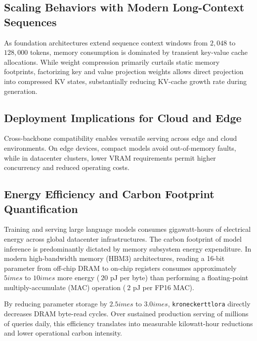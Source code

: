 \subsection{Scaling Behaviors with Modern Long-Context Sequences}
As foundation architectures extend sequence context windows from $2{,}048$ to $128{,}000$ tokens, memory consumption is dominated by transient key-value cache allocations. While weight compression primarily curtails static memory footprints, factorizing key and value projection weights allows direct projection into compressed KV states, substantially reducing KV-cache growth rate during generation.

\subsection{Deployment Implications for Cloud and Edge}
Cross-backbone compatibility enables versatile serving across edge and cloud environments. On edge devices, compact models avoid out-of-memory faults, while in datacenter clusters, lower VRAM requirements permit higher concurrency and reduced operating costs.

\subsection{Energy Efficiency and Carbon Footprint Quantification}
Training and serving large language models consumes gigawatt-hours of electrical energy across global datacenter infrastructures. The carbon footprint of model inference is predominantly dictated by memory subsystem energy expenditure. In modern high-bandwidth memory (HBM3) architectures, reading a 16-bit parameter from off-chip DRAM to on-chip registers consumes approximately $5	imes$ to $10	imes$ more energy ($~20$ pJ per byte) than performing a floating-point multiply-accumulate (MAC) operation ($~2$ pJ per FP16 MAC).

By reducing parameter storage by $2.5	imes$ to $3.0	imes$, \texttt{kroneckerttlora} directly decreases DRAM byte-read cycles. Over sustained production serving of millions of queries daily, this efficiency translates into measurable kilowatt-hour reductions and lower operational carbon intensity.
